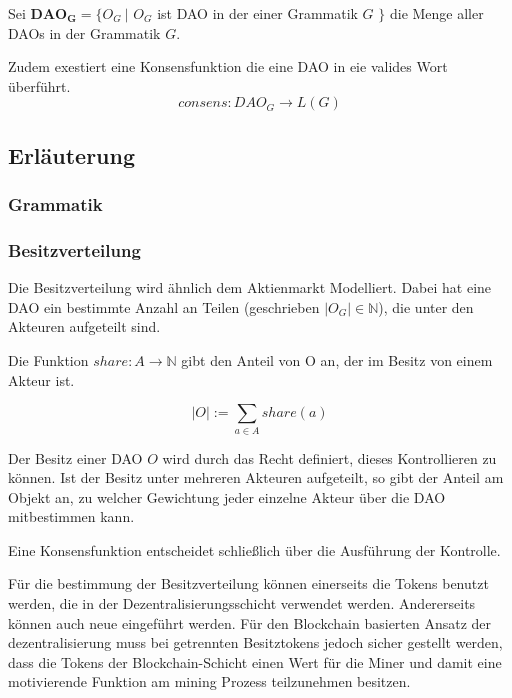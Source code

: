 \documentclass[a4paper,12pt]{article}
\begin{document}
Sei $\mathbf{DAO_G} = \{ O_G\ |$ $O_G$ ist DAO in der einer Grammatik $G$ $\}$ die Menge aller DAOs in der Grammatik $G$.

Zudem exestiert eine Konsensfunktion die eine DAO in eie valides Wort überführt. 
  \[consens: DAO_G \rightarrow L(G)\] 


\subsection{Erläuterung}

\subsubsection*{Grammatik}

\subsubsection*{Besitzverteilung}


Die Besitzverteilung wird ähnlich dem Aktienmarkt Modelliert. Dabei hat eine DAO ein bestimmte Anzahl an Teilen (geschrieben $|O_G| \in \mathbb{N}$), die unter den Akteuren aufgeteilt sind. 

Die Funktion $share: A \rightarrow \mathbb{N}$ gibt den Anteil von O an, der im Besitz von einem Akteur ist. 

\[ |O| := \sum_{a \in A} share(a) \] 

Der Besitz einer DAO $O$ wird durch das Recht definiert, dieses Kontrollieren zu können\cite{Waldron2004}. Ist der Besitz unter mehreren Akteuren aufgeteilt, so gibt der Anteil am Objekt an, zu welcher Gewichtung jeder einzelne Akteur über die DAO mitbestimmen kann.

Eine Konsensfunktion entscheidet schließlich über die Ausführung der Kontrolle.

Für die bestimmung der Besitzverteilung können einerseits die Tokens benutzt werden, die in der Dezentralisierungsschicht verwendet werden. Andererseits können auch neue eingeführt werden. Für den Blockchain basierten Ansatz der dezentralisierung muss bei getrennten Besitztokens jedoch sicher gestellt werden, dass die Tokens der Blockchain-Schicht einen Wert für die Miner und damit eine motivierende Funktion am mining Prozess teilzunehmen besitzen. 
\end{document}
